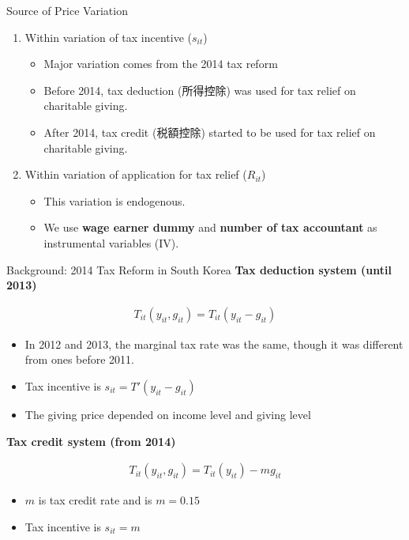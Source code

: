 \documentclass[
  ignorenonframetext,
  aspectratio=169,
]{beamer}
\providecommand{\tightlist}{%
  \setlength{\itemsep}{0pt}\setlength{\parskip}{0pt}}
\begin{document}
\begin{frame}{Source of Price Variation}
\protect\hypertarget{source-of-price-variation}{}
\begin{enumerate}
\tightlist
\item
  Within variation of tax incentive (\(s_{it}\))

  \begin{itemize}
  \tightlist
  \item
    Major variation comes from the 2014 tax reform
  \item
    Before 2014, tax deduction (所得控除) was used for tax relief on charitable giving.
  \item
    After 2014, tax credit (税額控除) started to be used for tax relief on charitable giving.
  \end{itemize}
\item
  Within variation of application for tax relief (\(R_{it}\))

  \begin{itemize}
  \tightlist
  \item
    This variation is endogenous.
  \item
    We use \textbf{wage earner dummy} and \textbf{number of tax accountant} as instrumental variables (IV).
  \end{itemize}
\end{enumerate}
\end{frame}

\begin{frame}{Background: 2014 Tax Reform in South Korea}
\protect\hypertarget{background-2014-tax-reform-in-south-korea}{}
\textbf{Tax deduction system (until 2013)}

\begin{align}
  T_{it}(y_{it}, g_{it}) = T_{it}(y_{it} - g_{it})
\end{align}

\begin{itemize}
\tightlist
\item
  In 2012 and 2013, the marginal tax rate was the same, though it was different from ones before 2011.
\item
  Tax incentive is \(s_{it} = T'(y_{it} - g_{it})\)
\item
  The giving price depended on income level and giving level
\end{itemize}

\textbf{Tax credit system (from 2014)}

\begin{align}
  T_{it}(y_{it}, g_{it}) = T_{it}(y_{it}) - m g_{it}
\end{align}

\begin{itemize}
\tightlist
\item
  \(m\) is tax credit rate and is \(m = 0.15\)
\item
  Tax incentive is \(s_{it} = m\)
\end{itemize}
\end{frame}
\end{document}
